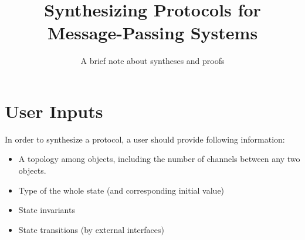 \documentclass[format=manuscript]{acmart}
\begin{document}
\title{Synthesizing Protocols for Message-Passing Systems}
\subtitle{A brief note about syntheses and proofs}

\makeatletter
\renewcommand\@formatdoi[1]{\ignorespaces}
\makeatother

\maketitle


\newcommand{\valOf}[1]{\ensuremath{#1.\texttt{v}}}
\newcommand{\stOf}[1]{\ensuremath{#1.\texttt{st}}}
\newcommand{\trsOf}[1]{\ensuremath{#1.\texttt{trs}}}
\newcommand{\trsYes}{\ensuremath{\top}}
\newcommand{\trsNo}{\ensuremath{\bot}}

\newcommand{\objGetRq}[1]{\ensuremath{#1.\texttt{getRq()}}}
\newcommand{\objGetRs}[2]{\ensuremath{#1:\texttt{getRs(}#2\texttt{)}}}
\newcommand{\objSetRq}[2]{\ensuremath{#1.\texttt{setRq(}#2\texttt{)}}}
\newcommand{\objSetRs}[1]{\ensuremath{#1:\texttt{setRs()}}}

\newcommand{\intSetRq}[2]{\ensuremath{#1 \leadsto #2.\texttt{setRq()}}}
\newcommand{\intSetRs}[2]{\ensuremath{#1 \leadsto #2.\texttt{setRs()}}}
\newcommand{\intInvRq}[2]{\ensuremath{#1 \leadsto #2.\texttt{invRq()}}}
\newcommand{\intInvRs}[2]{\ensuremath{#1 \leadsto #2.\texttt{invRs()}}}

\newcommand{\msgrule}[4]{\ensuremath{#1\vdash \{ #2 \} \xrightarrow{#3} \{ #4 \}}}

\newcommand{\refSec}[1]{[Section~\ref{#1}]}
\newcommand{\refInv}[1]{[Invariant~\ref{#1}]}
\newcommand{\refTrs}[1]{[Transition~\ref{#1}]}
\newcommand{\refFig}[1]{[Figure~\ref{#1}]}

\newcommand{\eg}{\emph{e.g.}}
\newcommand{\ie}{\emph{i.e.}}

\section{User Inputs}

In order to synthesize a protocol, a user should provide following information:

\begin{itemize}
\item A topology among objects, including the number of channels between any two
  objects.
\item Type of the whole state (and corresponding initial value)
\item State invariants
\item State transitions (by external interfaces)
\end{itemize}
\end{document}
